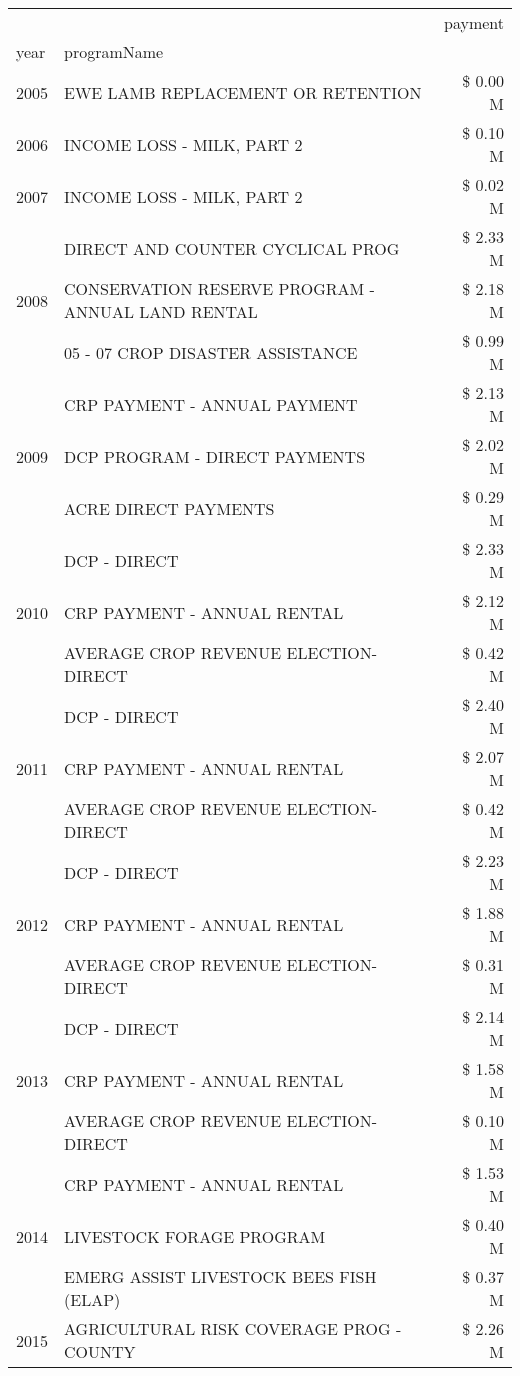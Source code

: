 \begin{tabular}{llr}
\toprule
 &  & payment \\
year & programName &  \\
\midrule
2005 & EWE LAMB REPLACEMENT OR RETENTION & \$ 0.00 M \\
\cline{1-3}
2006 & INCOME LOSS - MILK, PART 2 & \$ 0.10 M \\
\cline{1-3}
2007 & INCOME LOSS - MILK, PART 2 & \$ 0.02 M \\
\cline{1-3}
\multirow[t]{3}{*}{2008} & DIRECT AND COUNTER CYCLICAL PROG & \$ 2.33 M \\
 & CONSERVATION RESERVE PROGRAM - ANNUAL LAND RENTAL & \$ 2.18 M \\
 & 05 - 07 CROP DISASTER ASSISTANCE & \$ 0.99 M \\
\cline{1-3}
\multirow[t]{3}{*}{2009} & CRP PAYMENT - ANNUAL PAYMENT & \$ 2.13 M \\
 & DCP PROGRAM - DIRECT PAYMENTS & \$ 2.02 M \\
 & ACRE DIRECT PAYMENTS & \$ 0.29 M \\
\cline{1-3}
\multirow[t]{3}{*}{2010} & DCP - DIRECT & \$ 2.33 M \\
 & CRP PAYMENT - ANNUAL RENTAL & \$ 2.12 M \\
 & AVERAGE CROP REVENUE ELECTION-DIRECT & \$ 0.42 M \\
\cline{1-3}
\multirow[t]{3}{*}{2011} & DCP - DIRECT & \$ 2.40 M \\
 & CRP PAYMENT - ANNUAL RENTAL & \$ 2.07 M \\
 & AVERAGE CROP REVENUE ELECTION-DIRECT & \$ 0.42 M \\
\cline{1-3}
\multirow[t]{3}{*}{2012} & DCP - DIRECT & \$ 2.23 M \\
 & CRP PAYMENT - ANNUAL RENTAL & \$ 1.88 M \\
 & AVERAGE CROP REVENUE ELECTION-DIRECT & \$ 0.31 M \\
\cline{1-3}
\multirow[t]{3}{*}{2013} & DCP - DIRECT & \$ 2.14 M \\
 & CRP PAYMENT - ANNUAL RENTAL & \$ 1.58 M \\
 & AVERAGE CROP REVENUE ELECTION-DIRECT & \$ 0.10 M \\
\cline{1-3}
\multirow[t]{3}{*}{2014} & CRP PAYMENT - ANNUAL RENTAL & \$ 1.53 M \\
 & LIVESTOCK FORAGE PROGRAM & \$ 0.40 M \\
 & EMERG ASSIST LIVESTOCK BEES FISH (ELAP) & \$ 0.37 M \\
\cline{1-3}
\multirow[t]{3}{*}{2015} & AGRICULTURAL RISK COVERAGE PROG - COUNTY & \$ 2.26 M \\

\end{tabular}
